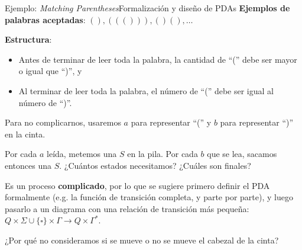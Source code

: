 \documentclass[spanish]{beamer}
\begin{document}
\begin{frame}{Ejemplo: \textit{Matching Parentheses}}{Formalización y diseño de PDAs}
    \textbf{Ejemplos de palabras aceptadas}: $(), ((())), ()(), \dots$ \pause

    \textbf{Estructura}:
    \begin{itemize}
        \item Antes de terminar de leer toda la palabra, la cantidad de ``('' debe ser mayor o igual que ``)'', y \pause
        \item Al terminar de leer toda la palabra, el número de ``('' debe ser igual al número de ``)''. \pause
    \end{itemize}

    Para no complicarnos, usaremos $a$ para representar ``('' y $b$ para representar ``)'' en la cinta. \pause

    \bigskip
    
    Por cada $a$ leída, metemos una $S$ en la pila. \pause
    Por cada $b$ que se lea, sacamos entonces una $S$.  \pause
    ¿Cuántos estados necesitamos? ¿Cuáles son finales? \pause

    Es un proceso \textbf{complicado}, por lo que se sugiere primero definir el PDA formalmente (e.g. la función de transición completa, y parte por parte), y luego pasarlo a un diagrama con una relación de transición más pequeña: $Q \times \Sigma \cup \{\square\} \times \Gamma  \to Q \times \Gamma^*$.
    
    ¿Por qué no consideramos si se mueve o no se mueve el cabezal de la cinta?
\end{frame}
\end{document}
